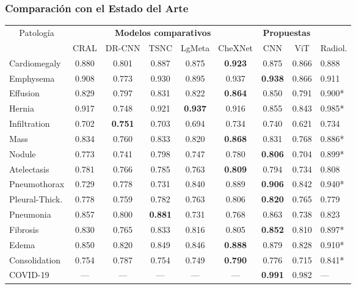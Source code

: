 \begin{frame}
\frametitle{Comparación con el Estado del Arte}
\begin{table}[ht!]
    \centering
    \tiny
    \begin{tabular}{|l||c|c|c|c|c|c|c|l|}
        \hline
        \multicolumn{1}{|c||}{Patología}	&	\multicolumn{5}{c|}{\bf Modelos comparativos}    &\multicolumn{2}{c|}{\bf Propuestas} & 	\\
        \cline{2-9}
                        &	CRAL	&	DR-CNN	&	TSNC	& LgMeta & CheXNet	& CNN	    & ViT & 	Radiol.	\\
        \hline\hline
        Cardiomegaly	&	0.880	&	0.801	&	0.887	&	0.875	&\bf{0.923}	&	0.875	& 0.866 &	0.888	\\
        Emphysema	    &	0.908	&	0.773	&	0.930	&	0.895	&	0.937	&\bf{0.938}	& 0.866 &   0.911	\\
        Effusion	    &	0.829	&	0.797	&	0.831	&	0.822	&\bf{0.864}	&	0.850	& 0.791 &   0.900*	\\
        Hernia	        &	0.917	&	0.748	&	0.921	&\bf{0.937}	&	0.916	&	0.855	& 0.843 &   0.985*	\\
        Infiltration	&	0.702	&\bf{0.751}	&	0.703	&	0.694	&	0.734	&	0.740	& 0.621 &	0.734	\\
        Mass	        &	0.834	&	0.760	&	0.833	&	0.820	&\bf{0.868}	&	0.831	& 0.768 &	0.886*	\\
        Nodule	        &	0.773	&	0.741	&	0.798	&	0.747	&	0.780	&\bf{0.806}	& 0.704 &	0.899*	\\
        Atelectasis	    &	0.781	&	0.766	&	0.785	&	0.763	&\bf{0.809}	&	0.794	& 0.734 &	0.808	\\
        Pneumothorax	&	0.729	&	0.778	&	0.731	&	0.840	&	0.889	&\bf{0.906}	& 0.842 &	0.940*	\\
        Pleural-Thick.	&	0.778	&	0.759	&	0.782	&	0.763	&	0.806	&\bf{0.820}	& 0.765 &	0.779	\\
        Pneumonia	    &	0.857	&	0.800	&\bf{0.881}	&	0.731	&	0.768	&	0.863	& 0.738 &	0.823	\\
        Fibrosis	    &	0.830	&	0.765	&	0.833	&	0.816	&	0.805	&\bf{0.852}	& 0.810 &	0.897*	\\
        Edema	        &	0.850	&	0.820	&	0.849	&	0.846	&\bf{0.888}	&	0.879	& 0.828 &	0.910*	\\
        Consolidation	&	0.754	&	0.787	&	0.754	&	0.749	&\bf{0.790}	&	0.776	& 0.715 &	0.841*	\\
        \hline
        COVID-19	    &	---	    &	---	    &	---	    &	---	    &	---	    &\bf{0.991}	& 0.982 &	---	    \\

\end{tabular}
\end{table}
\end{frame}
